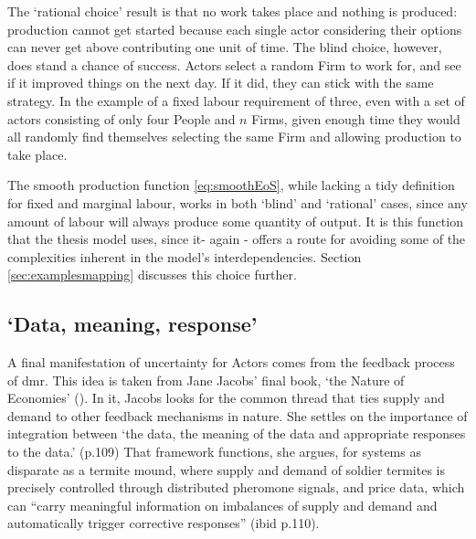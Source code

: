 {The `rational choice' result is that no work takes place and nothing is produced: production cannot get started because each single actor considering their options can never get above contributing one unit of time.  The blind choice, however, does stand a chance of success. Actors select a random Firm to work for, and see if it improved things on the next day. If it did, they can stick with the same strategy. In the example of a fixed labour requirement of three, even with a set of actors consisting of only four People and $n$ Firms, given enough time they would all randomly find themselves selecting the same Firm and allowing production to take place.

The smooth production function \eqref{eq:smoothEoS}, while lacking a tidy definition for fixed and marginal labour, works in both `blind' and `rational' cases, since any amount of labour will always produce some quantity of output. It is this function that the thesis model uses, since it- again - offers a route for avoiding some of the complexities inherent in the model's interdependencies. Section \ref{sec:examplesmapping} discusses this choice further.


\subsection{`Data, meaning, response' \label{sec:dmr}}

A final manifestation of uncertainty for Actors comes from the feedback process of \gls{dmr}. This idea is taken from Jane Jacobs' final book, `the Nature of Economies' (\citealt{jacobs_nature_2001}). In it, Jacobs looks for the common thread that ties supply and demand to other feedback mechanisms in nature. She settles on the importance of integration between `the data, the meaning of the data and appropriate responses to the data.' (p.109) That framework functions, she argues, for systems as disparate as a termite mound, where supply and demand of soldier termites is precisely controlled through distributed pheromone signals, and price data, which can ``carry meaningful information on imbalances of supply and demand and automatically trigger corrective responses'' (ibid p.110). 

}
